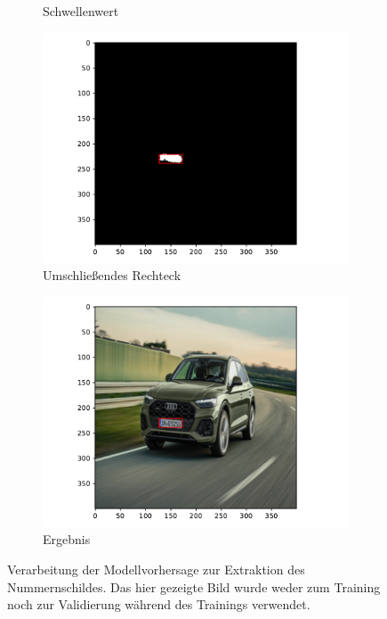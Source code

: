 \begin{figure}
\begin{subfigure}{0.495\textwidth}
        \caption{Schwellenwert}
    \end{subfigure}
    \begin{subfigure}{0.495\textwidth}
        \centering
        \includegraphics[width=\textwidth]{abbildungen/verarbeitung_3}
        \caption{Umschlie{\ss}endes Rechteck}
    \end{subfigure}
    \begin{subfigure}{0.495\textwidth}
        \centering
        \includegraphics[width=\textwidth]{abbildungen/verarbeitung_4}
        \caption{Ergebnis}
    \end{subfigure}
    \caption[Verarbeitung der Modellvorhersage]{Verarbeitung der Modellvorhersage zur Extraktion des
        Nummernschildes. Das hier gezeigte Bild wurde weder zum Training
        noch zur Validierung w\"ahrend des Trainings verwendet.}
    \label{fig:verarbeitung}
\end{figure}

